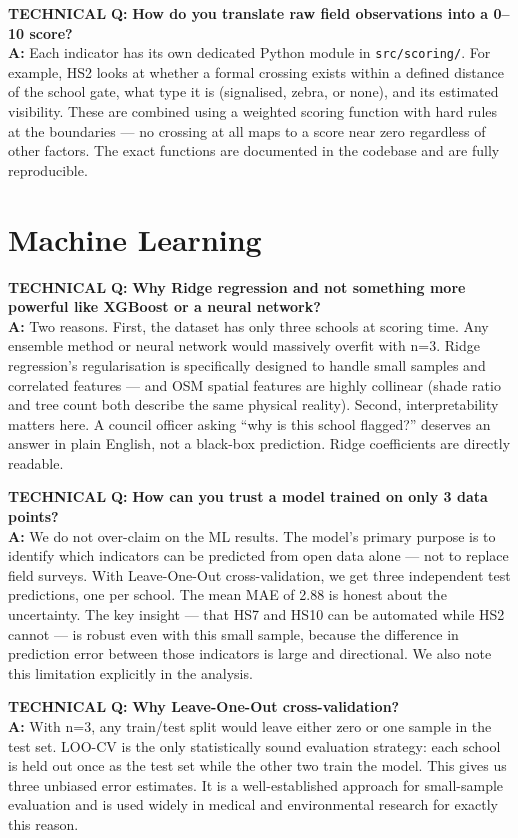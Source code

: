 \documentclass[10pt,a4paper]{extarticle}
\newcommand{\qa}[4]{%
  \begin{mdframed}[
    backgroundcolor=PG,
    linecolor=MG,
    linewidth=1.2pt,
    leftline=true, rightline=false, topline=false, bottomline=false,
    innerleftmargin=10pt, innerrightmargin=8pt,
    innertopmargin=6pt, innerbottommargin=7pt,
    skipabove=5pt, skipbelow=2pt
  ]
  \noindent
  \colorbox{#2}{\tiny\color{white}\textbf{#1}}\hspace{4pt}%
  {\bfseries\color{DG} Q:} {\bfseries\color{INK}#3}\\[3pt]
  {\bfseries\color{MG} A:} {\color{SLT}#4}
  \end{mdframed}%
}
\begin{document}
\qa{TECHNICAL}{MG}
{How do you translate raw field observations into a 0--10 score?}
{Each indicator has its own dedicated Python module in \texttt{src/scoring/}. For example, HS2 looks at whether a formal crossing exists within a defined distance of the school gate, what type it is (signalised, zebra, or none), and its estimated visibility. These are combined using a weighted scoring function with hard rules at the boundaries --- no crossing at all maps to a score near zero regardless of other factors. The exact functions are documented in the codebase and are fully reproducible.}

\section{Machine Learning}

\qa{TECHNICAL}{MG}
{Why Ridge regression and not something more powerful like XGBoost or a neural network?}
{Two reasons. First, the dataset has only three schools at scoring time. Any ensemble method or neural network would massively overfit with n=3. Ridge regression's regularisation is specifically designed to handle small samples and correlated features --- and OSM spatial features are highly collinear (shade ratio and tree count both describe the same physical reality). Second, interpretability matters here. A council officer asking ``why is this school flagged?'' deserves an answer in plain English, not a black-box prediction. Ridge coefficients are directly readable.}

\qa{TECHNICAL}{MG}
{How can you trust a model trained on only 3 data points?}
{We do not over-claim on the ML results. The model's primary purpose is to identify which indicators can be predicted from open data alone --- not to replace field surveys. With Leave-One-Out cross-validation, we get three independent test predictions, one per school. The mean MAE of 2.88 is honest about the uncertainty. The key insight --- that HS7 and HS10 can be automated while HS2 cannot --- is robust even with this small sample, because the difference in prediction error between those indicators is large and directional. We also note this limitation explicitly in the analysis.}

\qa{TECHNICAL}{MG}
{Why Leave-One-Out cross-validation?}
{With n=3, any train/test split would leave either zero or one sample in the test set. LOO-CV is the only statistically sound evaluation strategy: each school is held out once as the test set while the other two train the model. This gives us three unbiased error estimates. It is a well-established approach for small-sample evaluation and is used widely in medical and environmental research for exactly this reason.}
\end{document}
